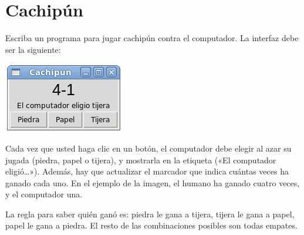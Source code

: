 \section{Cachipún}

Escriba un programa para jugar cachipún contra el computador. La
interfaz debe ser la siguiente:

\includegraphics{../../diapos/programas/tkinter/capturas/16.png}

Cada vez que usted haga clic en un botón, el computador debe elegir al
azar su jugada (piedra, papel o tijera), y mostrarla en la etiqueta («El
computador eligió\ldots{}»). Además, hay que actualizar el marcador que
indica cuántas veces ha ganado cada uno. En el ejemplo de la imagen, el
humano ha ganado cuatro veces, y el computador una.

La regla para saber quién ganó es: piedra le gana a tijera, tijera le
gana a papel, papel le gana a piedra. El resto de las combinaciones
posibles son todas empates.

